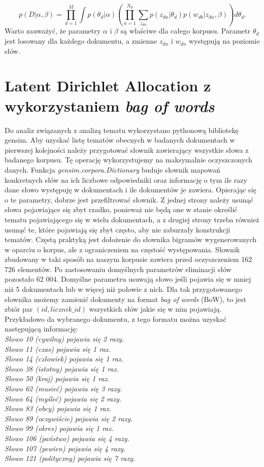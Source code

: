 \documentclass[a4paper,11pt,twoside]{report}
\theoremstyle{definition}
\begin{document}
\begin{equation}
p(D|\alpha,\beta) = \prod_{d=1}^M \int p(\theta_d |\alpha) \left(\prod_{n=1}^{N_d} \sum_{z_{dn}} p(z_{dn}|\theta_d)p(w_{db}|z_{dn}, \beta) \right) d\theta_d.
 \end{equation}
Warto zauważyć, że parametry $\alpha$ i $\beta$ są właściwe dla całego korpusu. Parametr $\theta_d$ jest losowany dla każdego dokumentu, a zmienne $z_{dn}$ i $w_{dn}$ występują na poziomie słów.

\section{Latent Dirichlet Allocation z wykorzystaniem \textit{bag of words}}
Do analiz związanych z analizą tematu wykorzystano pythonową bibliotekę gensim. 
Aby uzyskać listę tematów obecnych w badanych dokumentach w pierwszej kolejności należy przygotować słownik zawierający wszystkie słowa z badanego korpusu. Tę operację wykorzystujemy na maksymalnie oczyszczonych danych. Funkcja \textit{ gensim.corpora.Dictionary} buduje słownik mapowań konkretnych słów na ich liczbowe odpowiedniki oraz informację o tym ile razy dane słowo występuję w dokumentach i ile dokumentów je zawiera. Opierając się o te parametry, dobrze jest przefiltrować słownik. Z jednej strony należy usunąć słowa pojawiające się zbyt rzadko, ponieważ nie będą one w stanie określić tematu pojawiającego się w wielu dokumentach, a z drugiej strony trzeba również usunąć te, które pojawiają się zbyt często, aby nie zaburzały konstrukcji tematów. Częstą praktyką jest dołożenie do słownika bigramów wygenerowanych w oparciu o korpus, ale z ograniczeniem na częstość występowania.
Słownik zbudowany w taki sposób na naszym korpusie zawiera przed oczyszczeniem 162 726 elementów. Po zastosowaniu domyślnych parametrów eliminacji słów pozostało 62 004. Domyślne parametru usuwają słowo jeśli pojawia się w mniej niż 5 dokumentach lub w więcej niż połowie z nich.
Dla tak przygotowanego słownika możemy zamienić dokumenty na format \textit{bag of words} (BoW), to jest zbiór par $(id, licznik\_id)$ wszystkich słów jakie się w nim pojawiają. Przykładowo da wybranego dokumentu, z tego formatu można uzyskać następującą informację:\\
\textit{Słowo 10 (cywilny) pojawia się 2 razy.\\
Słowo 11 (czas) pojawia się 1 raz.\\
Słowo 14 (człowiek) pojawia się 1 raz.\\
Słowo 38 (istotny) pojawia się 1 raz.\\
Słowo 50 (kraj) pojawia się 1 raz.\\
Słowo 62 (musieć) pojawia się 3 razy.\\
Słowo 64 (myśleć) pojawia się 2 razy.\\
Słowo 83 (obcy) pojawia się 1 raz.\\
Słowo 89 (oczywiście) pojawia się 2 razy.\\
Słowo 99 (okres) pojawia się 1 raz.\\
Słowo 106 (państwo) pojawia się 4 razy.\\
Słowo 107 (pewien) pojawia się 4 razy.\\
Słowo 121 (polityczny) pojawia się 7 razy.}
\end{document}
